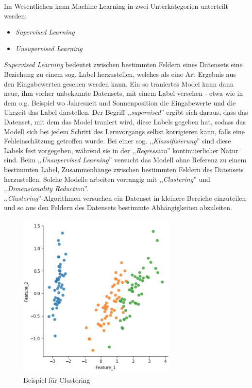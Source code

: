 Im Wesentlichen kann Machine Learning in zwei Unterkategorien unterteilt werden:
\begin{itemize}
    \item \textit{Supervised Learning} 
    \item \textit{Unsupervised Learning}
\end{itemize}
\textit{Supervised Learning} bedeutet zwischen bestimmten Feldern eines Datensets eine Beziehung
zu einem sog. Label herzustellen, welches als eine Art Ergebnis aus den Eingabewerten gesehen 
werden kann. Ein so traniertes Model kann dann neue, ihm vorher unbekannte Datensets, mit einem 
Label versehen - etwa wie in dem o.g. Beispiel wo Jahreszeit und Sonnenposition die Eingabewerte 
und die Uhrzeit das Label darstellen. Der Begriff ,,\textit{supervised}'' ergibt sich daraus, dass 
das Datenset, mit dem das Model traniert wird, diese Labels gegeben 
hat, sodass das Modell sich bei jedem Schritt des Lernvorgangs selbst korrigieren kann, falls 
eine Fehleinschätzung getroffen wurde.
Bei einer sog. ,,\textit{Klassifizierung}'' sind diese Labels fest vorgegeben, während sie in der 
,,\textit{Regression}'' kontinuierlicher Natur sind.\newline\newline
Beim ,,\textit{Unsupervised Learning}'' versucht das Modell ohne Referenz zu einem bestimmten 
Label, Zusammenhänge zwischen bestimmten Feldern des Datensets herzustellen. Solche Modelle 
arbeiten vorrangig mit ,,\textit{Clustering}'' und ,,\textit{Dimensionality Reduction}''.\\
,,\textit{Clustering}''-Algorithmen versuchen ein Datenset in kleinere Bereiche einzuteilen und
so aus den Feldern des Datensets bestimmte Abhängigkeiten abzuleiten.
\begin{figure}[h]
    \centering
    \includegraphics[width=8.0cm]{./pic/Clustering_Beispiel.png}
    \caption{Beispiel für Clustering}
    \label{fig:Clustering_Beispiel}
\end{figure}

